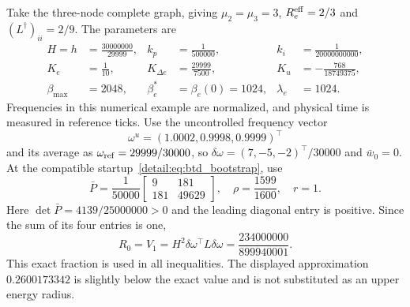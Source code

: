 Take the three-node complete graph, giving
$\mu_2=\mu_3=3$, $R_e^{\rm eff}=2/3$ and
$(L^\dagger)_{ii}=2/9$. The parameters are
\begin{align}
 H=h&=\frac{30000000}{29999},&k_p&=\frac1{500000},&k_i&=\frac1{20000000000},\nonumber\\
 K_e&=\frac1{10},&K_{\Delta e}&=\frac{29999}{7500},&K_u&=-\frac{768}{18749375},\nonumber\\
 \beta_{\max}&=2048,&\beta^*_e&=\beta_e(0)=1024,&\lambda_e&=1024.
 \label{detail:eq:btd_example_gains}
\end{align}
Frequencies in this numerical example are normalized, and physical time is measured in reference ticks. Use the uncontrolled frequency vector
\[
 \omega^u=(1.0002,0.9998,0.9999)^\top
\]
and its average as
$\omega_{\rm ref}=29999/30000$, so
$\delta\omega=(7,-5,-2)^\top/30000$ and $\bar w_0=0$.
At the compatible startup~\eqref{detail:eq:btd_bootstrap}, use
\begin{equation}
 \bar P=\frac1{50000}\begin{bmatrix}9&181\\181&49629\end{bmatrix},
 \quad\rho=\frac{1599}{1600},\quad r=1.
 \label{detail:eq:btd_witness}
\end{equation}
Here $\det\bar P=4139/25000000>0$ and the leading diagonal entry is
positive. Since the sum of its four entries is one,
\begin{equation}
 R_0=V_1=H^2\delta\omega^\top L\delta\omega
     =\frac{234000000}{899940001}.
 \label{detail:eq:btd_d_R0}
\end{equation}
This exact fraction is used in all inequalities. The displayed approximation
$0.2600173342$ is slightly below the exact value and is not substituted as
an upper energy radius.

